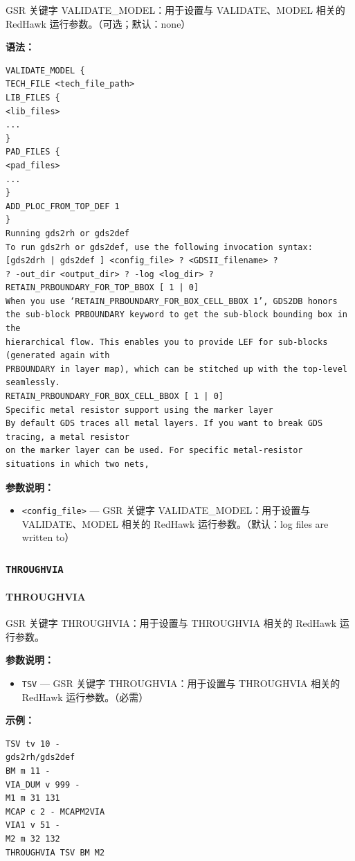 GSR 关键字 VALIDATE_MODEL：用于设置与 VALIDATE、MODEL 相关的 RedHawk 运行参数。（可选；默认：none）

\textbf{语法：}
\begin{lstlisting}
VALIDATE_MODEL {
TECH_FILE <tech_file_path>
LIB_FILES {
<lib_files>
...
}
PAD_FILES {
<pad_files>
...
}
ADD_PLOC_FROM_TOP_DEF 1
}
Running gds2rh or gds2def
To run gds2rh or gds2def, use the following invocation syntax:
[gds2drh | gds2def ] <config_file> ? <GDSII_filename> ?
? -out_dir <output_dir> ? -log <log_dir> ?
RETAIN_PRBOUNDARY_FOR_TOP_BBOX [ 1 | 0]
When you use ‘RETAIN_PRBOUNDARY_FOR_BOX_CELL_BBOX 1’, GDS2DB honors
the sub-block PRBOUNDARY keyword to get the sub-block bounding box in the
hierarchical flow. This enables you to provide LEF for sub-blocks (generated again with
PRBOUNDARY in layer map), which can be stitched up with the top-level seamlessly.
RETAIN_PRBOUNDARY_FOR_BOX_CELL_BBOX [ 1 | 0]
Specific metal resistor support using the marker layer
By default GDS traces all metal layers. If you want to break GDS tracing, a metal resistor
on the marker layer can be used. For specific metal-resistor situations in which two nets,
\end{lstlisting}

\textbf{参数说明：}
\begin{itemize}
\item \texttt{<config\_file>} — GSR 关键字 VALIDATE\_MODEL：用于设置与 VALIDATE、MODEL 相关的 RedHawk 运行参数。（默认：log files are written to）
\end{itemize}

\subsubsection{\texttt{THROUGHVIA}}
\paragraph*{THROUGHVIA}

GSR 关键字 THROUGHVIA：用于设置与 THROUGHVIA 相关的 RedHawk 运行参数。

\textbf{参数说明：}
\begin{itemize}
\item \texttt{TSV} — GSR 关键字 THROUGHVIA：用于设置与 THROUGHVIA 相关的 RedHawk 运行参数。（必需）
\end{itemize}

\textbf{示例：}
\begin{lstlisting}
TSV tv 10 -
gds2rh/gds2def
BM m 11 -
VIA_DUM v 999 -
M1 m 31 131
MCAP c 2 - MCAPM2VIA
VIA1 v 51 -
M2 m 32 132
THROUGHVIA TSV BM M2
\end{lstlisting}

